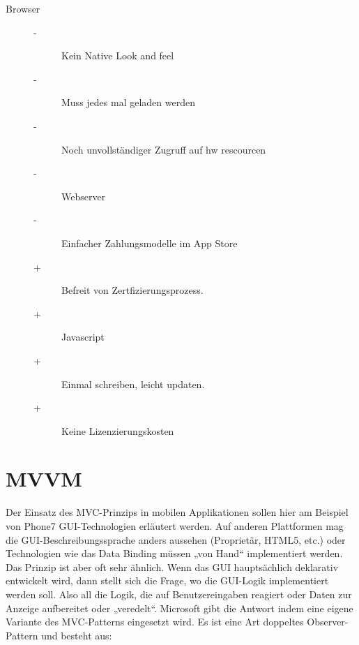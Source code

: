 \documentclass[a4paper,10pt]{scrreprt}
\begin{document}
\begin{description}
 \item [Browser]
 \begin{description}
  \item[-] Kein Native Look and feel
  \item[-] Muss jedes mal geladen werden
  \item[-] Noch unvollständiger Zugruff auf hw rescourcen
  \item[-] Webserver
  \item[-] Einfacher Zahlungsmodelle im App Store
  \item[+] Befreit von Zertfizierungsprozess.
  \item[+] Javascript
  \item [+] Einmal schreiben, leicht updaten.
  \item[+] Keine Lizenzierungskosten
 \end{description}

\end{description}

\section{MVVM}
Der Einsatz des MVC-Prinzips in mobilen Applikationen sollen hier am Beispiel von Phone7 GUI-Technologien
erläutert werden. Auf anderen Plattformen mag die GUI-Beschreibungssprache anders aussehen (Proprietär,
HTML5, etc.) oder Technologien wie das Data Binding müssen „von Hand“ implementiert werden. Das Prinzip ist
aber oft sehr ähnlich.
Wenn das GUI hauptsächlich deklarativ entwickelt wird, dann stellt sich die Frage, wo die GUI-Logik
implementiert werden soll. Also all die Logik, die auf Benutzereingaben reagiert oder Daten zur Anzeige
aufbereitet oder „veredelt“. Microsoft gibt die Antwort indem eine eigene Variante des MVC-Patterns
eingesetzt wird. Es ist eine Art doppeltes Observer-Pattern und besteht aus:
\end{document}
